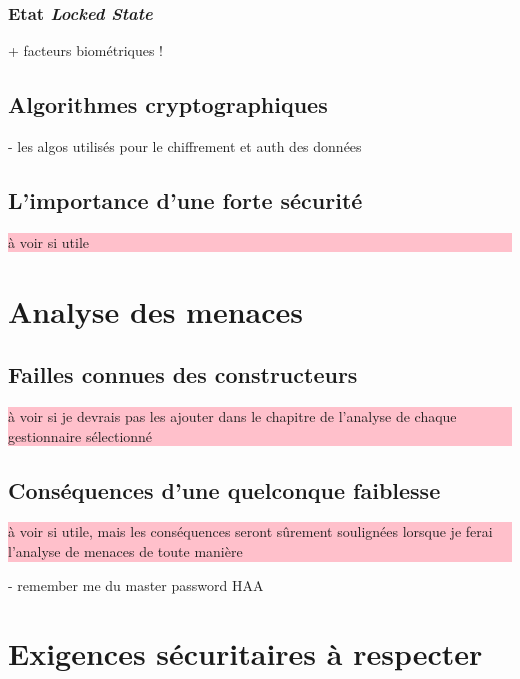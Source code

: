 \subsubsection{Etat \textit{Locked State}}

+ facteurs biométriques !

\subsection{Algorithmes cryptographiques}
- les algos utilisés pour le chiffrement et auth des données 
\subsection{L'importance d'une forte sécurité}
\colorbox{pink}{\parbox{15cm}{à voir si utile}}
\section{Analyse des menaces}
\subsection{Failles connues des constructeurs}
\colorbox{pink}{\parbox{15cm}{à voir si je devrais pas les ajouter dans le chapitre de l'analyse de chaque gestionnaire sélectionné}}
\subsection{Conséquences d'une quelconque faiblesse}
\colorbox{pink}{\parbox{15cm}{à voir si utile, mais les conséquences seront sûrement soulignées lorsque je ferai l'analyse de menaces de toute manière}}
- remember me du master password HAA
\section{Exigences sécuritaires à respecter}